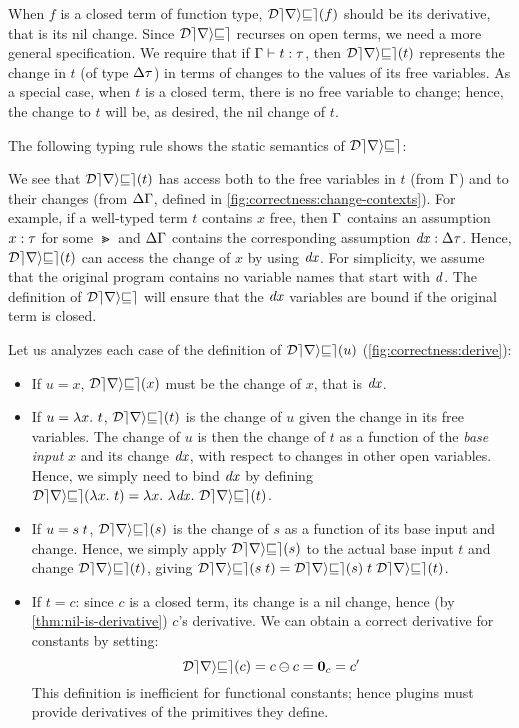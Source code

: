 When $f$ is a closed term of function type,
$\Derive{f}$ should be its derivative, that is its nil change.
Since $\mathcal{Derive}$ recurses on open terms, we need a more general
specification.
%
We require that if $\Typing{t}{\tau}$, then $\Derive{t}$
represents the change in $t$ (of type $\Change{\Gt}$) in terms of
changes to the values of its free variables. As a special case,
when $t$ is a closed term, there is no free variable to change;
hence, the change to $t$ will be, as desired, the nil change of
$t$.

The following typing rule shows the static semantics of
$\mathcal{Derive}$:
\begin{typing}
  {}
\end{typing}

We see that $\Derive{t}$ has access both to the
free variables in $t$ (from $\Gamma$) and to their changes (from
$\Delta \Gamma$, defined in
\cref{fig:correctness:change-contexts}).
For example, if a
well-typed term $t$ contains $x$ free, then $\Gamma$ contains an
assumption $\HasType{x}{\Gt}$ for some $\Gt$ and
$\Delta \Gamma$ contains the corresponding assumption
$\HasType{\D x}{\DeltaType{\Gt}}$. Hence, $\Derive{t}$ can
access the change of $x$ by using $\mathit{dx}$. For simplicity, 
we assume that the original program contains no variable names
that start with $\mathit{d}$.
The definition of $\mathcal{Derive}$ will ensure that
the $\mathit{dx}$ variables are bound if the original term is closed.

Let us analyzes each case of the definition of $\Derive{u}$
(\cref{fig:correctness:derive}):
\begin{itemize}
\item If $u = x$, $\Derive{x}$ must be the change of $x$, that is
$\mathit{dx}$.
\item If $u = \Lam{x}{t}$, $\Derive{t}$ is the change of
  $u$ given the change in its free variables. The change of $u$
  is then the change of $t$ as a function of the \emph{base input}
  $x$ and its change
  $\mathit{dx}$, with respect to changes in other open variables. Hence,
  we simply need to bind $\mathit{dx}$ by defining $\Derive{\Lam{x}{t}}
  = \Lam{x}{\Lam{\D x}{\Derive{t}}}$.
\item If $u = \App{s}{t}$, $\Derive{s}$ is the change of $s$ as a function
  of its base input and change. Hence, we simply apply $\Derive{s}$ to 
  the actual base input $t$ and change $\Derive{t}$, giving
  $\Derive{\App{s}{t}} =
  \App{\App{\Derive{s}}{t}}{\Derive{t}}$.
\item If $t = c$: since $c$ is a closed term, its
  change is a nil change, hence (by \cref{thm:nil-is-derivative}) $c$'s derivative. We can
  obtain a correct derivative for constants by setting:
  \[
  \Derive{c} =
  \Diff{c}{c} = \Nil{c} = c'
  \]
  This definition is inefficient for functional constants; hence plugins must provide derivatives
  of the primitives they define.
\end{itemize}

